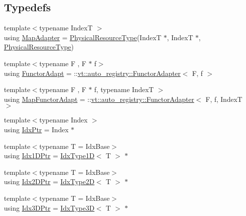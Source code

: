 \subsection*{Typedefs}
\begin{DoxyCompactItemize}
\item 
{\footnotesize template$<$typename IndexT $>$ }\\using \hyperlink{namespacevt_1_1mapping_a41b113c28bb6430fbcb5be66e08ccf9f}{Map\+Adapter} = \hyperlink{namespacevt_a2dc36fcada816dc6d11774d650328ee9}{Physical\+Resource\+Type}(IndexT $\ast$, IndexT $\ast$, \hyperlink{namespacevt_a2dc36fcada816dc6d11774d650328ee9}{Physical\+Resource\+Type})
\item 
{\footnotesize template$<$typename F , F $\ast$ f$>$ }\\using \hyperlink{namespacevt_1_1mapping_a9502cb3a918b8389f64351638edab39f}{Functor\+Adapt} = \+::\hyperlink{structvt_1_1auto__registry_1_1_functor_adapter}{vt\+::auto\+\_\+registry\+::\+Functor\+Adapter}$<$ F, f $>$
\item 
{\footnotesize template$<$typename F , F $\ast$ f, typename IndexT $>$ }\\using \hyperlink{namespacevt_1_1mapping_add4b5257a62b56d194f7e931b608f8f0}{Map\+Functor\+Adapt} = \+::\hyperlink{structvt_1_1auto__registry_1_1_functor_adapter}{vt\+::auto\+\_\+registry\+::\+Functor\+Adapter}$<$ F, f, IndexT $>$
\item 
{\footnotesize template$<$typename Index $>$ }\\using \hyperlink{namespacevt_1_1mapping_a1bcab0d331bff853fe09c964d5e9cc8c}{Idx\+Ptr} = Index $\ast$
\item 
{\footnotesize template$<$typename T  = Idx\+Base$>$ }\\using \hyperlink{namespacevt_1_1mapping_a8b576cf2f31069778e4951f64bccafd8}{Idx1\+D\+Ptr} = \hyperlink{namespacevt_a36127c6500f2311908c959be653da40e}{Idx\+Type1D}$<$ T $>$ $\ast$
\item 
{\footnotesize template$<$typename T  = Idx\+Base$>$ }\\using \hyperlink{namespacevt_1_1mapping_a6832cbb1361fe72fd7ec730e7b7773b3}{Idx2\+D\+Ptr} = \hyperlink{namespacevt_ab0fbc5ddf69b5aa0ed6a8d1658b504eb}{Idx\+Type2D}$<$ T $>$ $\ast$
\item 
{\footnotesize template$<$typename T  = Idx\+Base$>$ }\\using \hyperlink{namespacevt_1_1mapping_aacc737158b6517f2d760ffc8d1b5abca}{Idx3\+D\+Ptr} = \hyperlink{namespacevt_a65e4a83c0567ecb7a54b78e9b8e7d7ab}{Idx\+Type3D}$<$ T $>$ $\ast$

\end{DoxyCompactItemize}
